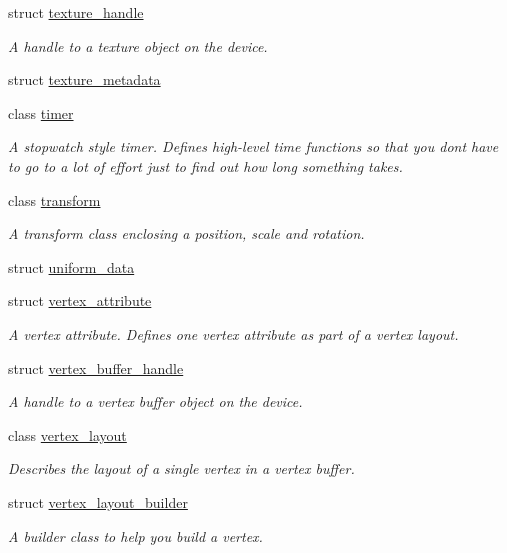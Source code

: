 \begin{DoxyCompactItemize}
struct \mbox{\hyperlink{structmoka_1_1texture__handle}{texture\+\_\+handle}}
\begin{DoxyCompactList}\small\item\em A handle to a texture object on the device. \end{DoxyCompactList}\item 
struct \mbox{\hyperlink{structmoka_1_1texture__metadata}{texture\+\_\+metadata}}
\item 
class \mbox{\hyperlink{classmoka_1_1timer}{timer}}
\begin{DoxyCompactList}\small\item\em A stopwatch style timer. Defines high-\/level time functions so that you don\textquotesingle{}t have to go to a lot of effort just to find out how long something takes. \end{DoxyCompactList}\item 
class \mbox{\hyperlink{classmoka_1_1transform}{transform}}
\begin{DoxyCompactList}\small\item\em A transform class enclosing a position, scale and rotation. \end{DoxyCompactList}\item 
struct \mbox{\hyperlink{structmoka_1_1uniform__data}{uniform\+\_\+data}}
\item 
struct \mbox{\hyperlink{structmoka_1_1vertex__attribute}{vertex\+\_\+attribute}}
\begin{DoxyCompactList}\small\item\em A vertex attribute. Defines one vertex attribute as part of a vertex layout. \end{DoxyCompactList}\item 
struct \mbox{\hyperlink{structmoka_1_1vertex__buffer__handle}{vertex\+\_\+buffer\+\_\+handle}}
\begin{DoxyCompactList}\small\item\em A handle to a vertex buffer object on the device. \end{DoxyCompactList}\item 
class \mbox{\hyperlink{classmoka_1_1vertex__layout}{vertex\+\_\+layout}}
\begin{DoxyCompactList}\small\item\em Describes the layout of a single vertex in a vertex buffer. \end{DoxyCompactList}\item 
struct \mbox{\hyperlink{structmoka_1_1vertex__layout__builder}{vertex\+\_\+layout\+\_\+builder}}
\begin{DoxyCompactList}\small\item\em A builder class to help you build a vertex. \end{DoxyCompactList}\item 

\end{DoxyCompactItemize}
